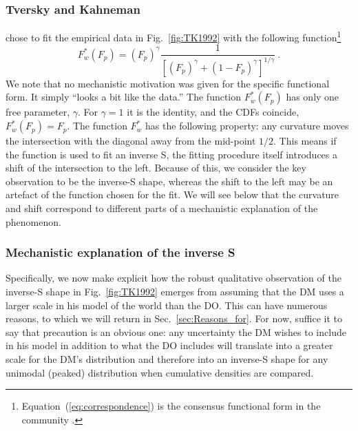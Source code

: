 \documentclass[a4paper, 12pt]{article}
\newcommand{\elabel}[1]{\label{eq:#1}}
\newcommand{\Eref}[1]{Equation~(\ref{eq:#1})}
\newcommand{\fref}[1]{Fig.~\ref{fig:#1}}
\newcommand{\secref}[1]{Sec.~\ref{sec:#1}}
\newcommand{\be}{\begin{equation}}
\newcommand{\ee}{\end{equation}}
\newcommand{\OP}[1]{{\it ***OP: #1 OP***}}
\begin{document}
\subsubsection{Tversky and Kahneman}
\citet{TverskyKahneman1992} chose to fit the empirical data in \fref{TK1992} with the following function\footnote{\Eref{correspondence} is the consensus functional form in the community \cite{Barberis2013}.}
% 
\be
\elabel{correspondence}
F_w^*\left(F_p\right) = \left(F_p\right)^\gamma \frac{1}{\left[\left(F_p\right)^\gamma+\left(1-F_p\right)^\gamma\right]^{1/\gamma}} ~.
\ee
We note that no mechanistic motivation was given for the specific functional form. It simply ``looks a bit like the data.''
% 
The function $F_w^*\left(F_p\right)$ has only one free parameter, $\gamma$. For $\gamma=1$ it is the identity, and the CDFs coincide, $F_w^*\left(F_p\right)=F_p$. The function $F_w^*$ has the following property: any curvature moves the intersection with the diagonal away from the mid-point $1/2$. This means if the function is used to fit an inverse S, the fitting procedure itself introduces a shift of the intersection to the left. Because of this, we consider the key observation to be the inverse-S shape, whereas the shift to the left may be an artefact of the function chosen for the fit. We will see below that the curvature and shift correspond to different parts of a mechanistic explanation of the phenomenon.

\subsubsection{Mechanistic explanation of the inverse S}
Specifically, we now make explicit how the robust qualitative observation of the inverse-S shape in \fref{TK1992} emerges from assuming that the DM uses a larger scale in his model of the world than the DO. This can have numerous reasons, to which we will return in \secref{Reasons_for}. For now, suffice it to say that precaution is an obvious one: any uncertainty the DM wishes to include in his model in addition to what the DO includes will translate into a greater scale for the DM's distribution and therefore into an inverse-S shape for any unimodal (peaked) distribution when cumulative densities are compared.
\end{document}
